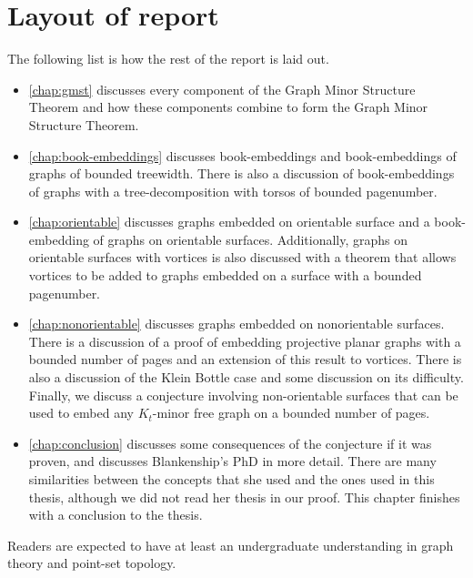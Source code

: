 \section{Layout of report}
The following list is how the rest of the report is laid out. 
\begin{itemize}
	\item \cref{chap:gmst} discusses every component of the Graph Minor Structure Theorem and how these components combine to form the Graph Minor Structure Theorem. 
	\item \cref{chap:book-embeddings} discusses book-embeddings and book-embeddings of graphs of bounded treewidth. There is also a discussion of book-embeddings of graphs with a tree-decomposition with torsos of bounded pagenumber. 
	\item \cref{chap:orientable} discusses graphs embedded on orientable surface and a book-embedding of graphs on orientable surfaces. Additionally, graphs on orientable surfaces with vortices is also discussed with a theorem that allows vortices to be added to graphs embedded on a surface with a bounded pagenumber. 
	\item \cref{chap:nonorientable} discusses graphs embedded on nonorientable surfaces. There is a discussion of a proof of embedding projective planar graphs with a bounded number of pages and an extension of this result to vortices. There is also a discussion of the Klein Bottle case and some discussion on its difficulty. Finally, we discuss a conjecture involving non-orientable surfaces that can be used to embed any $K_t$-minor free graph on a bounded number of pages. 
	\item \cref{chap:conclusion} discusses some consequences of the conjecture if it was proven, and discusses Blankenship's PhD in more detail. There are many similarities between the concepts that she used and the ones used in this thesis, although we did not read her thesis in our proof. This chapter finishes with a conclusion to the thesis. 
\end{itemize}

Readers are expected to have at least an undergraduate understanding in graph theory and point-set topology. 
